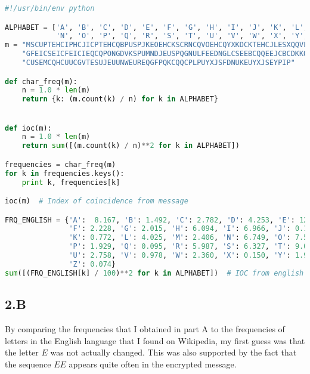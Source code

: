 \documentclass[12pt]{article}
\begin{document}
\begin{lstlisting}[language=Python, caption=Code for answering problem 2.A]
#!/usr/bin/env python

ALPHABET = ['A', 'B', 'C', 'D', 'E', 'F', 'G', 'H', 'I', 'J', 'K', 'L', 'M',
            'N', 'O', 'P', 'Q', 'R', 'S', 'T', 'U', 'V', 'W', 'X', 'Y', 'Z']
m = "MSCUPTEHCIPHCJICPTEHCQBPUSPJKEOEHCKSCRNCQVOEHCQYXKDCKTEHCJLESXQQVLCEQLCPU"\
    "GFEICSEICFEICIEQCQPONGDVKSPUMNDJEUSPQGNULFEEDNGLCSEEBCQQEEJCBCDKKQXIPUCNJ"\
    "CUSEMCQHCUUCGVTESUJEUUNWEUREQGFPQKCQQCPLPUYXJSFDNUKEUYXJSEYPIP"

def char_freq(m):
    n = 1.0 * len(m)
    return {k: (m.count(k) / n) for k in ALPHABET}


def ioc(m):
    n = 1.0 * len(m)
    return sum([(m.count(k) / n)**2 for k in ALPHABET])

frequencies = char_freq(m)
for k in frequencies.keys():
    print k, frequencies[k]

ioc(m)  # Index of coincidence from message

FRQ_ENGLISH = {'A':  8.167, 'B': 1.492, 'C': 2.782, 'D': 4.253, 'E': 12.702,
               'F': 2.228, 'G': 2.015, 'H': 6.094, 'I': 6.966, 'J': 0.153,
               'K': 0.772, 'L': 4.025, 'M': 2.406, 'N': 6.749, 'O': 7.507,
               'P': 1.929, 'Q': 0.095, 'R': 5.987, 'S': 6.327, 'T': 9.056,
               'U': 2.758, 'V': 0.978, 'W': 2.360, 'X': 0.150, 'Y': 1.974,
               'Z': 0.074}
sum([(FRQ_ENGLISH[k] / 100)**2 for k in ALPHABET])  # IOC from english language
\end{lstlisting}


\subsection*{2.B}
By comparing the frequencies that I obtained in part A to the frequencies of letters in the English language that I found on Wikipedia,
my first guess was that the letter $E$ was not actually changed. This was also supported by the fact that the sequence $EE$ appears quite often in
the encrypted message.
\end{document}
